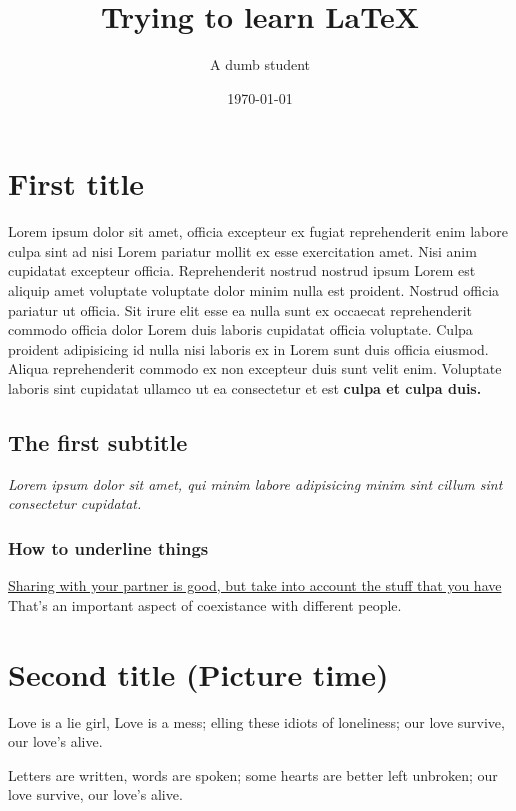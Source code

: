 \documentclass{article}
\title{Trying to learn {\LaTeX}}
\date{\today}
\author{A dumb student}
\begin{document}
\maketitle

\section{First title}

Lorem ipsum dolor sit amet, officia excepteur ex fugiat reprehenderit enim
labore culpa sint ad nisi Lorem pariatur mollit ex esse exercitation amet. Nisi
anim cupidatat excepteur officia. Reprehenderit nostrud nostrud ipsum Lorem est
aliquip amet voluptate voluptate dolor minim nulla est proident. Nostrud
officia pariatur ut officia. Sit irure elit esse ea nulla sunt ex occaecat
reprehenderit commodo officia dolor Lorem duis laboris cupidatat officia
voluptate. Culpa proident adipisicing id nulla nisi laboris ex in Lorem sunt
duis officia eiusmod. Aliqua reprehenderit commodo ex non excepteur duis sunt
velit enim. Voluptate laboris sint cupidatat ullamco ut ea consectetur et est
\textbf{culpa et culpa duis.}

\subsection{The first subtitle}

\textit{Lorem ipsum dolor sit amet, qui minim labore adipisicing minim sint}
\emph{cillum sint consectetur cupidatat.}

\subsubsection{How to underline things}

\underline{Sharing with your partner is good, but take into account the stuff
	that you have} That's an important aspect of coexistance with different people.

\section{Second title (Picture time)}

Love is a lie girl, Love is a mess; elling these idiots of loneliness; our love
survive, our love's alive.

Letters are written, words are spoken; some hearts are better left unbroken; our
love survive, our love's alive.
\end{document}
